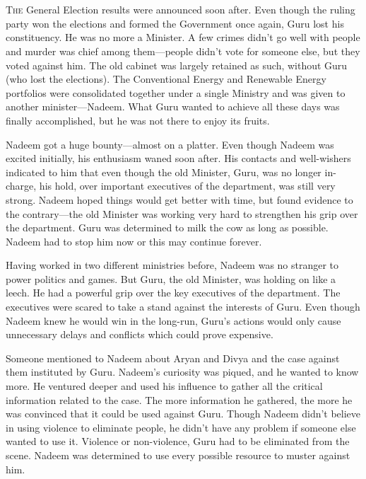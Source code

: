 \chapter{}

\lettrine{T}{he} General Election results were announced soon after. Even though the ruling
party won the elections and formed the Government once again, Guru lost his
constituency. He was no more a Minister. A few crimes didn't go well with people
and murder was chief among them—people didn't vote for someone else, but they
voted against him. The old cabinet was largely retained as such, without Guru
(who lost the elections). The Conventional Energy and Renewable Energy
portfolios were consolidated together under a single Ministry and was given to
another minister—Nadeem. What Guru wanted to achieve all these days was
finally accomplished, but he was not there to enjoy its fruits.

Nadeem got a huge bounty—almost on a platter. Even though Nadeem was excited
initially, his enthusiasm waned soon after. His contacts and well-wishers
indicated to him that even though the old Minister, Guru, was no longer
in-charge, his hold, over important executives of the department, was still very
strong. Nadeem hoped things would get better with time, but found evidence to
the contrary—the old Minister was working very hard to strengthen his grip
over the department. Guru was determined to milk the cow as long as possible.
Nadeem had to stop him now or this may continue forever.

Having worked in two different ministries before, Nadeem was no stranger to
power politics and games. But Guru, the old Minister, was holding on like a
leech. He had a powerful grip over the key executives of the department. The
executives were scared to take a stand against the interests of Guru. Even
though Nadeem knew he would win in the long-run, Guru's actions would only cause
unnecessary delays and conflicts which could prove expensive.

Someone mentioned to Nadeem about Aryan and Divya and the case against them
instituted by Guru. Nadeem's curiosity was piqued, and he wanted to know more. He
ventured deeper and used his influence to gather all the critical information
related to the case. The more information he gathered, the more he was convinced
that it could be used against Guru. Though Nadeem didn't believe in using
violence to eliminate people, he didn't have any problem if someone else wanted
to use it. Violence or non-violence, Guru had to be eliminated from the scene.
Nadeem was determined to use every possible resource to muster against him.

